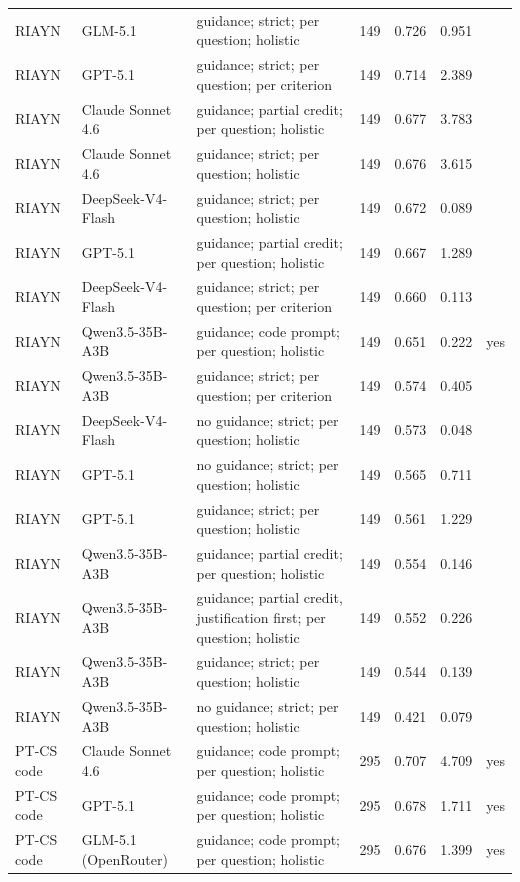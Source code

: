 \documentclass[10pt]{article}
\begin{document}
\begin{longtable}{ll>{\raggedright\arraybackslash}p{5.2cm}rrrc}
RIAYN & GLM-5.1 & guidance; strict; per question; holistic & 149 & 0.726 & 0.951 &  \\
RIAYN & GPT-5.1 & guidance; strict; per question; per criterion & 149 & 0.714 & 2.389 &  \\
RIAYN & Claude Sonnet 4.6 & guidance; partial credit; per question; holistic & 149 & 0.677 & 3.783 &  \\
RIAYN & Claude Sonnet 4.6 & guidance; strict; per question; holistic & 149 & 0.676 & 3.615 &  \\
RIAYN & DeepSeek-V4-Flash & guidance; strict; per question; holistic & 149 & 0.672 & 0.089 &  \\
RIAYN & GPT-5.1 & guidance; partial credit; per question; holistic & 149 & 0.667 & 1.289 &  \\
RIAYN & DeepSeek-V4-Flash & guidance; strict; per question; per criterion & 149 & 0.660 & 0.113 &  \\
RIAYN & Qwen3.5-35B-A3B & guidance; code prompt; per question; holistic & 149 & 0.651 & 0.222 & yes \\
RIAYN & Qwen3.5-35B-A3B & guidance; strict; per question; per criterion & 149 & 0.574 & 0.405 &  \\
RIAYN & DeepSeek-V4-Flash & no guidance; strict; per question; holistic & 149 & 0.573 & 0.048 &  \\
RIAYN & GPT-5.1 & no guidance; strict; per question; holistic & 149 & 0.565 & 0.711 &  \\
RIAYN & GPT-5.1 & guidance; strict; per question; holistic & 149 & 0.561 & 1.229 &  \\
RIAYN & Qwen3.5-35B-A3B & guidance; partial credit; per question; holistic & 149 & 0.554 & 0.146 &  \\
RIAYN & Qwen3.5-35B-A3B & guidance; partial credit, justification first; per question; holistic & 149 & 0.552 & 0.226 &  \\
RIAYN & Qwen3.5-35B-A3B & guidance; strict; per question; holistic & 149 & 0.544 & 0.139 &  \\
RIAYN & Qwen3.5-35B-A3B & no guidance; strict; per question; holistic & 149 & 0.421 & 0.079 &  \\
PT-CS code & Claude Sonnet 4.6 & guidance; code prompt; per question; holistic & 295 & 0.707 & 4.709 & yes \\
PT-CS code & GPT-5.1 & guidance; code prompt; per question; holistic & 295 & 0.678 & 1.711 & yes \\
PT-CS code & GLM-5.1 (OpenRouter) & guidance; code prompt; per question; holistic & 295 & 0.676 & 1.399 & yes \\

\end{longtable}
\end{document}
